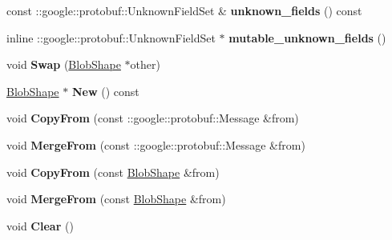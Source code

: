 \begin{DoxyCompactItemize}
\item 
\mbox{\label{classcaffe_1_1_blob_shape_a1050cbb9069e2ebdd74a9ebc3491200e}} 
const \+::google\+::protobuf\+::\+Unknown\+Field\+Set \& {\bfseries unknown\+\_\+fields} () const
\item 
\mbox{\label{classcaffe_1_1_blob_shape_a21defa0fdc1acaebd4231dfcc6b30031}} 
inline \+::google\+::protobuf\+::\+Unknown\+Field\+Set $\ast$ {\bfseries mutable\+\_\+unknown\+\_\+fields} ()
\item 
\mbox{\label{classcaffe_1_1_blob_shape_a84c9b618777f23576d1d0232ba3dae9b}} 
void {\bfseries Swap} (\mbox{\hyperlink{classcaffe_1_1_blob_shape}{Blob\+Shape}} $\ast$other)
\item 
\mbox{\label{classcaffe_1_1_blob_shape_ac6062986697daead24f0befc7a099bed}} 
\mbox{\hyperlink{classcaffe_1_1_blob_shape}{Blob\+Shape}} $\ast$ {\bfseries New} () const
\item 
\mbox{\label{classcaffe_1_1_blob_shape_ad7e8e39ad783efe88b4fc31c4db311f1}} 
void {\bfseries Copy\+From} (const \+::google\+::protobuf\+::\+Message \&from)
\item 
\mbox{\label{classcaffe_1_1_blob_shape_a4bf7c37ba4679a51f87f8eeab5fd58e0}} 
void {\bfseries Merge\+From} (const \+::google\+::protobuf\+::\+Message \&from)
\item 
\mbox{\label{classcaffe_1_1_blob_shape_a6723661521f09ff1588fb869979fcfc4}} 
void {\bfseries Copy\+From} (const \mbox{\hyperlink{classcaffe_1_1_blob_shape}{Blob\+Shape}} \&from)
\item 
\mbox{\label{classcaffe_1_1_blob_shape_a047a526573f397cf0744906f1ac1b670}} 
void {\bfseries Merge\+From} (const \mbox{\hyperlink{classcaffe_1_1_blob_shape}{Blob\+Shape}} \&from)
\item 
\mbox{\label{classcaffe_1_1_blob_shape_a698cb0924590158d4532f7559bf3ddb0}} 
void {\bfseries Clear} ()
\item 
\mbox{\label{classcaffe_1_1_blob_shape_a39fd41bd4405053d986feef855fdd2ee}} 

\end{DoxyCompactItemize}
